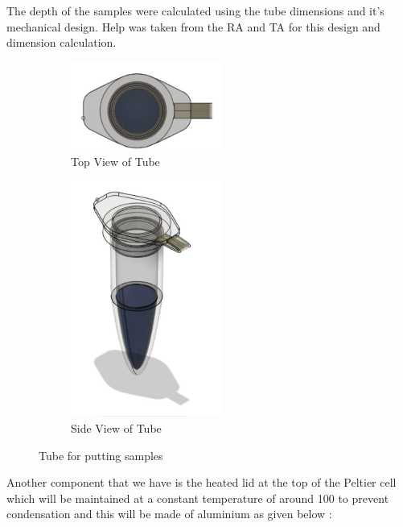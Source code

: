 \documentclass{article}
\begin{document}
The depth of the samples were calculated using the tube dimensions and it's mechanical design. Help was taken from the RA and TA for this design and dimension calculation.


\begin{figure}[htp]
    \centering
    \begin{subfigure}[b]{0.4\textwidth}
    \centering
    \includegraphics[width=5cm]{Images/Tubetop.jpeg}
    \caption{Top View of Tube}
    \end{subfigure}
    \hfill
    \begin{subfigure}[b]{0.5\textwidth}
    \centering
    \includegraphics[width=5cm]{Images/Tubeside.jpeg}
    \caption{Side View of Tube}
    \end{subfigure}
    \caption{Tube for putting samples}
    \label{fig:galaxy}
\end{figure}

\newpage
Another component that we have is the heated lid at the top of the Peltier cell which will be maintained at a constant temperature of around 100 to prevent condensation and this will be made of aluminium as given below :\\
\end{document}
